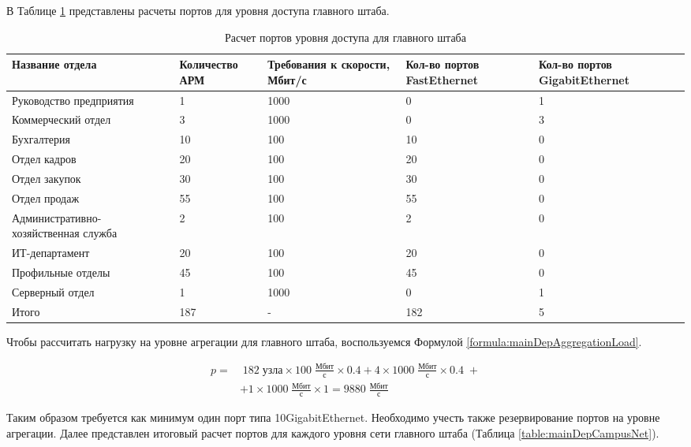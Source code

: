 \documentclass[14pt, a4paper]{extarticle}
\numberwithin{equation}{section}
\begin{document}
В Таблице \ref{table:mainDepAccessLevel} представлены расчеты портов для уровня доступа 
главного штаба.

\begin{table}[H]
\centering
\small
\caption{Расчет портов уровня доступа для главного штаба}
\begin{tabular}{|m{4cm}|m{2.5cm}|m{2.5cm}|m{2.5cm}|m{3cm}|}
\hline
\textbf{Название отдела} & \textbf{Количество АРМ} & \textbf{Требования к скорости, Мбит/с} & \textbf{Кол-во портов FastEthernet} & \textbf{Кол-во портов GigabitEthernet} \\
\hline
Руководство предприятия & 1 & 1000 & 0 & 1 \\
\hline
Коммерческий отдел & 3 & 1000 & 0 & 3 \\
\hline
Бухгалтерия & 10 & 100 & 10 & 0 \\
\hline
Отдел кадров & 20 & 100 & 20 & 0 \\
\hline
Отдел закупок & 30 & 100 & 30 & 0 \\
\hline
Отдел продаж & 55 & 100 & 55 & 0 \\
\hline
Административно-хозяйственная служба & 2 & 100 & 2 & 0 \\
\hline
ИТ-департамент & 20 & 100 & 20 & 0 \\
\hline
Профильные отделы & 45 & 100 & 45 & 0 \\
\hline
Серверный отдел & 1 & 1000 & 0 & 1 \\
\hline
Итого & 187 & - & 182 & 5 \\
\hline 
\end{tabular}
\label{table:mainDepAccessLevel}
\end{table}

Чтобы рассчитать нагрузку на уровне агрегации для 
главного штаба, воспользуемся Формулой \ref{formula:mainDepAggregationLoad}.

\begin{equation}
\begin{aligned}
p = & \; 182 \; \text{узла} \times 100 \;\frac{\text{Мбит}}{\text{с}} \times 0.4 + 4 \times 1000 \;\frac{\text{Мбит}}{\text{с}} \times 0.4\; + \\
        & + 1 \times 1000\;\frac{\text{Мбит}}{\text{с}} \times 1 = 9880\;\frac{\text{Мбит}}{\text{с}}
\end{aligned}
\label{formula:mainDepAggregationLoad}
\end{equation}
               
Таким образом требуется как минимум один порт типа 10GigabitEthernet.
Необходимо учесть также резервирование портов на уровне агрегации.
Далее представлен итоговый расчет портов для каждого уровня сети
главного штаба (Таблица \ref{table:mainDepCampusNet}). 
\end{document}
